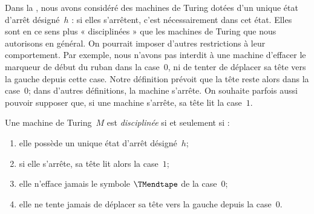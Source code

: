 \documentclass[../../../include/open-logic-section]{subfiles}
\begin{document}

\begin{explain}
Dans la , nous avons considéré des machines de
Turing dotées d'un unique état d'arrêt désigné~$h$ : si elles
s'arrêtent, c'est nécessairement dans cet état. Elles sont
en ce sens plus « disciplinées » que les machines de Turing
que nous autorisons en général. On pourrait imposer d'autres
restrictions à leur comportement. Par exemple, nous n'avons
pas interdit à une machine d'effacer le marqueur de début du
ruban dans la case~$0$, ni de tenter de déplacer sa tête vers
la gauche depuis cette case. Notre définition prévoit que
la tête reste alors dans la case~$0$; dans d'autres définitions,
la machine s'arrête. On souhaite parfois aussi pouvoir supposer
que, si une machine s'arrête, sa tête lit la case~$1$.
\end{explain}

\begin{defn}
Une machine de Turing~$M$ est \emph{disciplinée} si et
seulement si :
\begin{enumerate}
    \item elle possède un unique état d'arrêt désigné~$h$;
    \item si elle s'arrête, sa tête lit alors la case~$1$;
    \item elle n'efface jamais le symbole $\TMendtape$ de
      la case~$0$;
    \item elle ne tente jamais de déplacer sa tête vers la
      gauche depuis la case~$0$.
\end{enumerate}
\end{defn}
\end{document}
